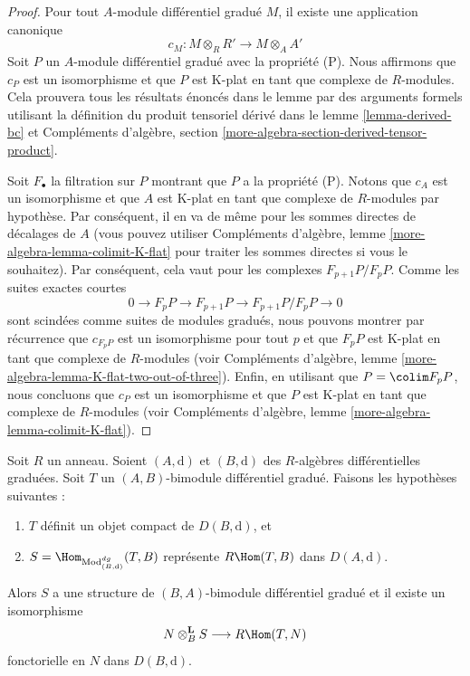 \begin{proof}
Pour tout $A$-module différentiel gradué $M$, il existe une application canonique
$$
c_M : M \otimes_R R' \longrightarrow M \otimes_A A'
$$
Soit $P$ un $A$-module différentiel gradué avec la propriété (P).
Nous affirmons que $c_P$ est un isomorphisme et que $P$ est K-plat en
tant que complexe de $R$-modules. Cela prouvera tous les résultats
énoncés dans le lemme par des arguments formels utilisant la
définition du produit tensoriel dérivé dans le lemme \ref{lemma-derived-bc}
et Compléments d'algèbre, section \ref{more-algebra-section-derived-tensor-product}.

\medskip\noindent
Soit $F_\bullet$ la filtration sur $P$ montrant que $P$ a la propriété (P). Notons que
$c_A$ est un isomorphisme et que $A$ est K-plat en tant que complexe de
$R$-modules par hypothèse. Par conséquent, il en va de même pour les sommes
directes de décalages de $A$ (vous pouvez utiliser
Compléments d'algèbre, lemme \ref{more-algebra-lemma-colimit-K-flat} pour
traiter les sommes directes si vous le souhaitez).
Par conséquent, cela vaut pour les complexes $F_{p + 1}P/F_pP$.
Comme les suites exactes courtes
$$
0 \to F_pP \to F_{p + 1}P \to F_{p + 1}P/F_pP \to 0
$$
sont scindées comme suites de modules gradués, nous pouvons montrer
par récurrence que $c_{F_pP}$ est un isomorphisme pour tout $p$
et que $F_pP$ est K-plat en tant que complexe de $R$-modules (voir
Compléments d'algèbre, lemme \ref{more-algebra-lemma-K-flat-two-out-of-three}).
Enfin, en utilisant que $P = \colim F_pP$, nous concluons que
$c_P$ est un isomorphisme et que $P$ est K-plat en tant
que complexe de $R$-modules (voir
Compléments d'algèbre, lemme \ref{more-algebra-lemma-colimit-K-flat}).
\end{proof}

\begin{lemma}
\label{lemma-RHom-is-tensor}
Soit $R$ un anneau.
Soient $(A, \text{d})$ et $(B, \text{d})$ des $R$-algèbres différentielles graduées. Soit $T$ un
$(A, B)$-bimodule différentiel gradué. Faisons les hypothèses
suivantes :
\begin{enumerate}
\item $T$ définit un objet compact de $D(B, \text{d})$, et
\item $S = \Hom_{\text{Mod}^{dg}_{(B, \text{d})}}(T, B)$
représente $R\Hom(T, B)$ dans $D(A, \text{d})$.
\end{enumerate}
Alors $S$ a une structure de $(B, A)$-bimodule différentiel gradué
et il existe un isomorphisme
$$
N \otimes_B^\mathbf{L} S \longrightarrow R\Hom(T, N)
$$
fonctorielle en $N$ dans $D(B, \text{d})$.
\end{lemma}

